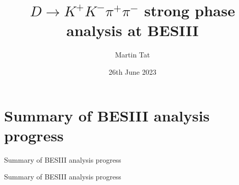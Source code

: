\documentclass{beamer}
\title[$K^+K^-\pi^+\pi^-$]{\texorpdfstring{$D\to K^+K^-\pi^+\pi^-$}{K+K-pi+pi-} strong phase analysis at BESIII}
\author{Martin Tat}
\institute{Oxford LHCb}
\date{26th June 2023}
\begin{document}
\begin{frame}
  \titlepage
\end{frame}


\section{Summary of BESIII analysis progress}
\begin{frame}{Summary of BESIII analysis progress}
  \begin{center}
    {\huge Summary of BESIII analysis progress}
  \end{center}
\end{frame}
\end{document}
